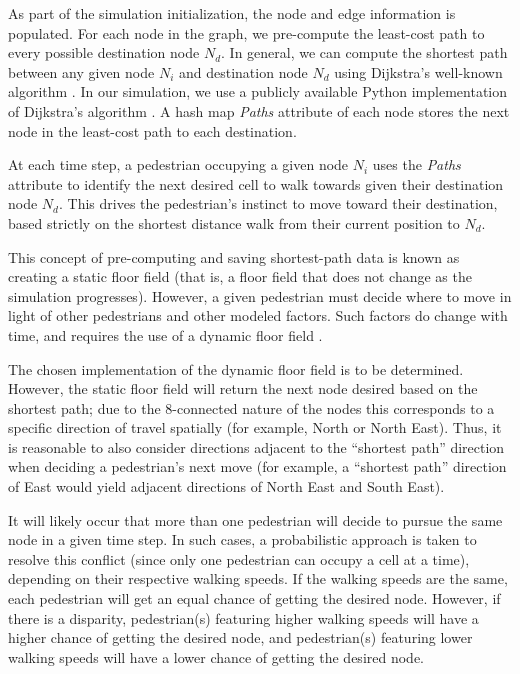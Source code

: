 \documentclass[12pt]{article}
\begin{document}
As part of the simulation initialization, the node and edge information is
populated. For each node in the graph, we pre-compute the least-cost path to
every possible destination node $N_d$. In general, we can compute the shortest
path between any given node $N_i$ and destination node $N_d$ using Dijkstra's
well-known algorithm \cite{dijkstra1959note}. In our simulation, we use a
publicly available Python implementation of Dijkstra's algorithm
\cite{eppstein-dijkstra}. A hash map \textit{Paths} attribute of each node
stores the next node in the least-cost path to each destination.

At each time step, a pedestrian occupying a given node $N_i$ uses the
\textit{Paths} attribute to identify the next desired cell to walk towards given
their destination node $N_d$. This drives the pedestrian’s instinct to move
toward their destination, based strictly on the shortest distance walk from
their current position to $N_d$.

This concept of pre-computing and saving shortest-path data is known as creating
a static floor field (that is, a floor field that does not change as the
simulation progresses). However, a given pedestrian must decide where to move
in light of other pedestrians and other modeled factors. Such factors do change
with time, and requires the use of a dynamic floor field
\cite{burstedde2001simulation}.

The chosen implementation of the dynamic floor field is to be determined.
However, the static floor field will return the next node desired based on the
shortest path; due to the 8-connected nature of the nodes this corresponds
to a specific direction of travel spatially (for example, North or North East).
Thus, it is reasonable to also consider directions adjacent to the “shortest
path” direction when deciding a pedestrian’s next move (for example, a “shortest
path” direction of East would yield adjacent directions of North East and
South East).

It will likely occur that more than one pedestrian will decide to pursue the
same node in a given time step. In such cases, a probabilistic approach is taken
to resolve this conflict (since only one pedestrian can occupy a cell at a
time), depending on their respective walking speeds. If the walking speeds are
the same, each pedestrian will get an equal chance of getting the desired node.
However, if there is a disparity, pedestrian(s) featuring higher walking speeds
will have a higher chance of getting the desired node, and pedestrian(s)
featuring lower walking speeds will have a lower chance of getting the desired
node.
\end{document}
